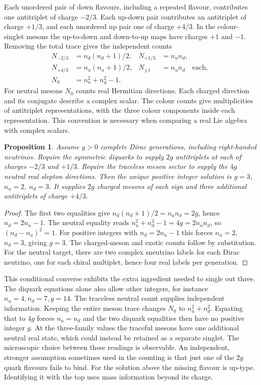 \documentclass[aps,prd,reprint,onecolumn,nofootinbib,amsmath,amssymb]{revtex4-2}
\newtheorem{proposition}{Proposition}
\begin{document}
Each unordered pair of down flavours, including a repeated flavour, contributes one antitriplet of charge $-2/3$. Each up-down pair contributes an antitriplet of charge $+1/3$, and each unordered up pair one of charge $+4/3$. In the colour-singlet mesons the up-to-down and down-to-up maps have charges $+1$ and $-1$. Removing the total trace gives the independent counts
\begin{equation}
\begin{aligned}
 N_{-2/3}&=n_d(n_d+1)/2, &N_{+1/3}&=n_u n_d,\\
 N_{+4/3}&=n_u(n_u+1)/2, &N_{\pm1}&=n_u n_d\quad\text{each},\\
 N_0&=n_u^2+n_d^2-1 .
\end{aligned}
\end{equation}
For neutral mesons $N_0$ counts real Hermitian directions. Each charged direction and its conjugate describe a complex scalar. The colour counts give multiplicities of antitriplet representations, with the three colour components inside each representation. This convention is necessary when comparing a real Lie algebra with complex scalars.

\begin{proposition}
Assume $g>0$ complete Dirac generations, including right-handed neutrinos. Require the symmetric diquarks to supply $2g$ antitriplets at each of charges $-2/3$ and $+1/3$. Require the traceless meson sector to supply the $4g$ neutral real slepton directions. Then the unique positive integer solution is $g=3$, $n_u=2$, $n_d=3$. It supplies $2g$ charged mesons of each sign and three additional antitriplets of charge $+4/3$.
\end{proposition}

\begin{proof}
The first two equalities give $n_d(n_d+1)/2=n_u n_d=2g$, hence $n_d=2n_u-1$. The neutral equality reads $n_u^2+n_d^2-1=4g=2n_u n_d$, so $(n_d-n_u)^2=1$. For positive integers with $n_d=2n_u-1$ this forces $n_u=2$, $n_d=3$, giving $g=3$. The charged-meson and exotic counts follow by substitution. For the neutral target, there are two complex sneutrino labels for each Dirac neutrino, one for each chiral multiplet, hence four real labels per generation.
\end{proof}

This conditional converse exhibits the extra ingredient needed to single out three. The diquark equations alone also allow other integers, for instance $n_u=4,n_d=7,g=14$. The traceless neutral count supplies independent information. Keeping the entire meson trace changes $N_0$ to $n_u^2+n_d^2$. Equating that to $4g$ forces $n_u=n_d$ and the two diquark equalities then have no positive integer $g$. At the three-family values the traceful mesons have one additional neutral real state, which could instead be retained as a separate singlet. The microscopic choice between these readings is observable. An independent, stronger assumption sometimes used in the counting is that just one of the $2g$ quark flavours fails to bind. For the solution above the missing flavour is up-type. Identifying it with the top uses mass information beyond its charge.
\end{document}
